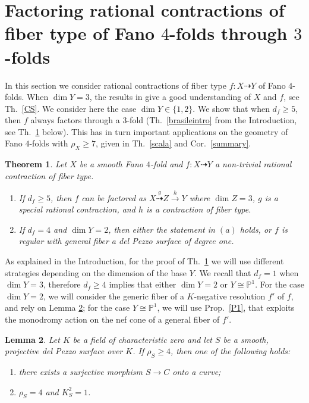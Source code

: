 \documentclass[a4paper,12pt]{amsart}
\newtheorem{thm}{Theorem}[section]
\newtheorem{lemma}[thm]{Lemma}
\theoremstyle{definition}
\numberwithin{figure}{section}
\numberwithin{table}{section}
\newcommand{\pr}{\mathbb{P}}
\begin{document}
\section{Factoring rational contractions of fiber type of Fano $4$-folds through $3$-folds}\label{secbrasile}
\noindent
In this section we consider rational contractions of fiber type $f\colon X\dasharrow Y$ of Fano $4$-folds.
When $\dim Y=3$, the results in \cite{3folds} give a good understanding of $X$ and $f$, see Th.~\ref{CS}.
We consider here the case
$\dim Y\in\{1,2\}$. We show that when $d_f\geq 5$, then $f$ always factors through a $3$-fold (Th.~\ref{brasileintro} from the Introduction, see Th.~\ref{brasile} below).
 This has in turn important applications on the geometry of Fano $4$-folds with $\rho_X\geq 7$, given in Th.~\ref{scala} and Cor.~\ref{summary}.
  \begin{thm}\label{brasile}
  Let $X$ be a smooth Fano $4$-fold and $f\colon X\dasharrow Y$ a non-trivial rational contraction of fiber type.
\begin{enumerate}[$(a)$]
\item
  If $d_f\geq 5$, then
 $f$ can be factored as $X\stackrel{g}{\dasharrow} Z\stackrel{h}{\to} Y$ where $\dim Z=3$, $g$ is a special rational contraction, and $h$ is a contraction of fiber type.
\item If $d_f=4$ and $\dim Y=2$, then either the statement in $(a)$ holds, or 
  $f$ is regular with general fiber a del Pezzo surface of degree one.
  \end{enumerate}
\end{thm}
As explained in the Introduction, for the proof of Th.~\ref{brasile} we will use different strategies depending on the dimension of the base $Y$.
We recall that $d_f=1$ when $\dim Y=3$, therefore $d_f\geq 4$ implies that either $\dim Y=2$ or $Y\cong\pr^1$.
For the case $\dim Y=2$, we will consider the generic fiber of a $K$-negative resolution $f'$ of $f$, and rely on Lemma \ref{cabofrio}; for the case $Y\cong\pr^1$, we will use Prop.~\ref{P1}, that exploits the monodromy action on the nef cone of a general fiber of $f'$.
  \begin{lemma}\label{cabofrio}
    Let $K$ be a field of characteristic zero and let $S$ be a smooth, projective del Pezzo surface over $K$.
      If $\rho_S\geq 4$, then one of the following holds:
      \begin{enumerate}[$(i)$]
        \item
          there exists a surjective morphism $S\to C$ onto a curve;
        \item $\rho_S=4$ and $K_S^2=1$.
          \end{enumerate}
      \end{lemma}
\end{document}
